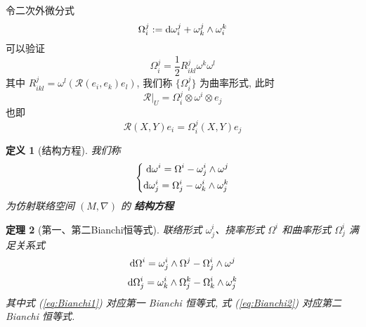 \documentclass{book}
\newtheorem{theorem}{\indent 定理}[section]
\newtheorem{definition}[theorem]{\indent 定义}
\newcommand{\md}{{\rm d}}
\begin{document}
\begin{itemize}
                令二次外微分式
                \begin{equation*}
                    \Omega^{j}_{i} := \md\omega^{j}_{i} + \omega^{j}_{k}\wedge\omega^{k}_{i}
                \end{equation*}
                可以验证
                \begin{equation*}
                    \Omega^{j}_{i} = \frac{1}{2}R_{ikl}^{j}\omega^k\omega^l
                \end{equation*}
                其中 $R_{ikl}^{j} = \omega^l\left(\mathcal{R}(e_i,e_k)e_l\right)$, 我们称 $\{\Omega^j_i\}$ 为曲率形式, 此时
                \begin{equation*}
                    \mathcal{R}\big|_U = \Omega^j_i\otimes\omega^i\otimes e_j
                \end{equation*}
                也即
                \begin{equation*}
                    \mathcal{R}(X,Y)e_i = \Omega^j_i(X,Y)e_j
                \end{equation*}
            \end{itemize}

            \begin{definition}[结构方程]
                我们称
                \begin{equation}
                    \left\{
                    \begin{aligned}
                        \md\omega^i = \Omega^i-\omega^i_j\wedge\omega^j \\
                        \md\omega^i_j = \Omega^i_j-\omega^i_k\wedge\omega^k_j
                    \end{aligned}
                    \right.
                \end{equation}
                为仿射联络空间 $(M,\nabla)$ 的 \textbf{结构方程}
            \end{definition}

            \begin{theorem}[第一、第二Bianchi恒等式]
                联络形式 $\omega^i_j$、挠率形式 $\Omega^i$ 和曲率形式 $\Omega^i_j$ 满足关系式
                \begin{equation} \label{eq:Bianchi1}
                    \md\Omega^i = \omega^i_j\wedge\Omega^j-\Omega^i_j\wedge\omega^j
                \end{equation}
                \begin{equation} \label{eq:Bianchi2}
                    \md\Omega^i_j = \omega^i_k\wedge\Omega^k_j-\Omega^i_k\wedge\omega^k_j
                \end{equation}
                其中式 (\ref{eq:Bianchi1}) 对应第一 \rm{Bianchi} 恒等式, 式 (\ref{eq:Bianchi2}) 对应第二 \rm{Bianchi} 恒等式.
            \end{theorem}
\end{document}
